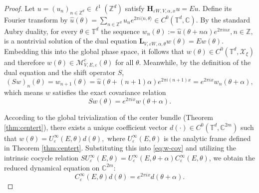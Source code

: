 \documentclass[reqno,11pt]{amsart}
\newcommand{\C}{{\mathbb C}}
\begin{document}
\begin{proof}
     Let $u=(u_n)_{n\in\mathbb{Z}^d}\in\ell^1(\mathbb{Z}^d)$ satisfy
$\mathbf{H}_{\varepsilon W,V,\alpha,x}u=Eu$.
Define its Fourier transform by
$\widehat u(\theta)=\sum_{n\in\mathbb{Z}^d} u_n  e^{2\pi i\langle n,\theta\rangle}\in C^0(\mathbb{T}^d,\C).
$
By the standard Aubry duality, for  every $\theta\in\mathbb{T}^d$ the sequence
$w_n(\theta):=\widehat u(\theta+n\alpha) e^{2\pi i n x}, n\in\mathbb{Z},$
is a nontrivial solution of the dual equation
$\mathbf{L}_{V,\varepsilon W,\alpha,\theta} w(\theta)=E w(\theta).
$ Embedding this into the global phase space, it follows that 
    $ w(\theta)  \in C^0(\mathbb{T}^d, \mathcal{X}_\xi) $
    and therefore $w(\theta) \in \mathcal{M}^c_{V,E,\varepsilon}(\theta)$ for all $\theta$.  Meanwhile, by the definition of the dual equation and the shift operator $S$, 
    $$(S w)_n(\theta) = w_{n+1}(\theta)= \widehat u(\theta+(n+1)\alpha) e^{2\pi i (n+1) x}=e^{2\pi i x}w_n(\theta+\alpha),$$
    which means $w$ satisfies the exact covariance relation
    \begin{equation}\label{eq:w-cov}
        S w(\theta) = e^{2\pi i x} w(\theta+\alpha).
    \end{equation}
   

According to the global trivialization of the center bundle (Theorem \ref{thm:centert}), there exists a unique coefficient vector $d(\cdot) \in C^0(\mathbb{T}^d, \mathbb{C}^{2m})$ such that 
    $ w(\theta) = U_\varepsilon^{\infty}(E,\theta) d(\theta),$
    where $U_\varepsilon^{\infty}(E,\theta)$ is the analytic frame defined in Theorem \ref{thm:centert}. Substituting this into \eqref{eq:w-cov} and utilizing the intrinsic cocycle relation $S U_\varepsilon^{\infty}(E,\theta) = U_\varepsilon^{\infty}(E,\theta+\alpha)C_{\varepsilon}^{\infty}(E,\theta)$, we obtain the reduced dynamical equation on $\mathbb{C}^{2m}$:
    $$
    C_{\varepsilon}^{\infty}(E,\theta) d(\theta) = e^{2\pi i x} d(\theta+\alpha).
    $$






\end{proof}
\end{document}
